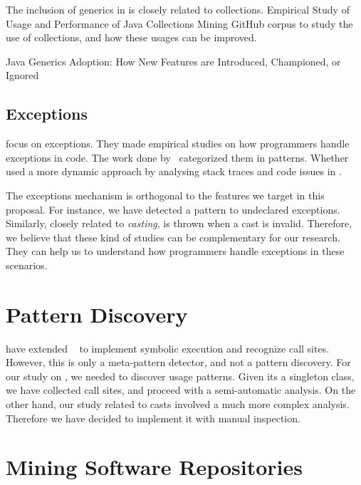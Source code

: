 The inclusion of generics in \java{} is closely related to collections.
Empirical Study of Usage and Performance of Java Collections
Mining GitHub corpus to study the use of collections, and how these usages can be improved.
\cite{Costa:2017:ESU:3030207.3030221}

Java Generics Adoption: How New Features are Introduced, Championed, or Ignored~\cite{Parnin:2011:JGA:1985441.1985446}


\subsection*{Exceptions}

\cite{Kery:2016:EPP:2901739.2903497,Asaduzzaman:2016:DUE:2901739.2903500} focus on exceptions.
They made empirical studies on how programmers handle exceptions in \java{} code.
The work done by~\cite{Nakshatri:2016:AEH:2901739.2903499} categorized them in patterns.
Whether~\cite{7180074} used a more dynamic approach by analysing stack traces and code issues in \github{}.

The exceptions mechanism is orthogonal to the features we target in this proposal.
For instance, we have detected a \smu{} pattern to \throw{} undeclared exceptions.
Similarly, closely related to \emph{casting}, \cce{} is thrown when a cast is invalid.
Therefore, we believe that these kind of studies can be complementary for our research. They can help us to understand how programmers handle exceptions in these scenarios.


\section{Pattern Discovery}

\cite{5463349} have extended \asm{}~\cite{Bruneton02asm:a,Kuleshov07} to implement symbolic execution and recognize call sites.
However, this is only a meta-pattern detector, and not a pattern discovery.
For our study on \smu{}, we needed to discover usage patterns.
Given its a singleton class, we have collected call sites,
and proceed with a semi-automatic analysis.
On the other hand, our study related to casts involved a much more complex analysis.
Therefore we have decided to implement it with manual inspection.

\section{Mining Software Repositories}

